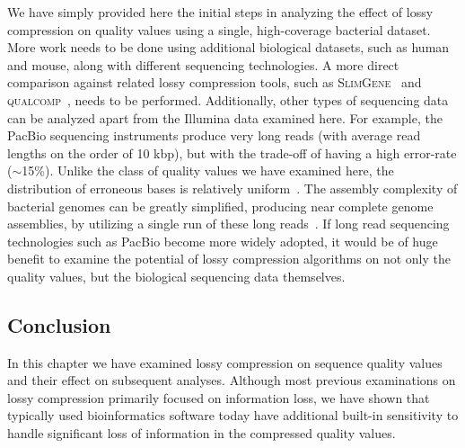 We have simply provided here the initial steps in analyzing the effect
of lossy compression on quality values using a single,
high-coverage bacterial dataset. More work needs to be done using
additional biological datasets, such as human and mouse, along with
different sequencing technologies. A more direct comparison against
related lossy compression tools, such as
\textsc{SlimGene}~\cite{Kozanitis:2011kl} and
\textsc{\textsc{q}ual\textsc{c}omp}~\cite{Ochoa:2013rt}, needs to be
performed. Additionally, other types of sequencing data can be
analyzed apart from the Illumina data examined here. For example, the
PacBio sequencing instruments produce very long reads (with average
read lengths on the order of 10 kbp), but with the trade-off of having
a high error-rate ($\sim$15\%). Unlike the class of quality values we
have examined here, the distribution of erroneous bases is relatively
uniform~\cite{Ferrarini:2013vf}. The assembly complexity of bacterial
genomes can be greatly simplified, producing near complete genome
assemblies, by utilizing a single run of these long
reads~\cite{Koren:2013ye}. If long read sequencing technologies such
as PacBio become more widely adopted, it would be of huge benefit to
examine the potential of lossy compression algorithms on not only the
quality values, but the biological sequencing data themselves.


%
%

\subsection{Conclusion}

In this chapter we have examined lossy compression on sequence quality
values and their effect on subsequent analyses. Although most previous
examinations on lossy compression primarily focused on information
loss, we have shown that typically used bioinformatics software today
have additional built-in sensitivity to handle significant loss of
information in the compressed quality values.
%
